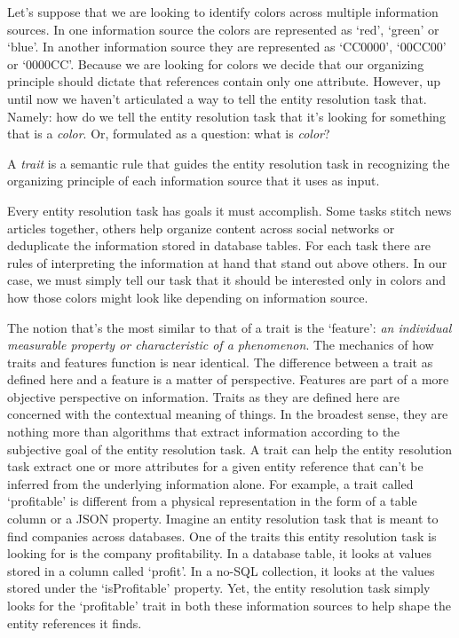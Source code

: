 \documentclass[11pt]{article}
\begin{document}
    Let's suppose that we are looking to identify colors across multiple
    information sources.
    In one information source the colors are represented as `red', `green' or 
    `blue'.
    In another information source they are represented as `CC0000', `00CC00' or
    `0000CC'.
    Because we are looking for colors we decide that our organizing principle
    should dictate that references contain only one attribute.
    However, up until now we haven't articulated a way to tell the entity
    resolution task that.
    Namely: how do we tell the entity resolution task that it's looking for
    something that is a \textit{color}.
    Or, formulated as a question: what is \textit{color}?

    \begin{defn}
        A \textit{trait} is a semantic rule that guides the entity resolution
        task in recognizing the organizing principle of each information source
        that it uses as input.
    \end{defn}

    Every entity resolution task has goals it must accomplish.
    Some tasks stitch news articles together, others help organize content
    across social networks or deduplicate the information stored in database
    tables.
    For each task there are rules of interpreting the information at hand that
    stand out above others.
    In our case, we must simply tell our task that it should be interested only
    in colors and how those colors might look like depending on information
    source.
    
    The notion that's the most similar to that of a trait is the `feature':
    \textit{an individual measurable property or characteristic of a
    phenomenon}\cite{bishop2006pattern}.
    The mechanics of how traits and features function is near identical.
    The difference between a trait as defined here and a feature is a matter of
    perspective.
    Features are part of a more objective perspective on information.
    Traits as they are defined here are concerned with the contextual meaning of
    things.
    In the broadest sense, they are nothing more than algorithms that extract
    information according to the subjective goal of the entity resolution task.
    A trait can help the entity resolution task extract one or more attributes
    for a given entity reference that can't be inferred from the underlying
    information alone.
    For example, a trait called `profitable' is different from a physical
    representation in the form of a table column or a JSON property.
    Imagine an entity resolution task that is meant to find companies across
    databases.
    One of the traits this entity resolution task is looking for is the company
    profitability.
    In a database table, it looks at values stored in a column called `profit'.
    In a no-SQL collection, it looks at the values stored under the
    `isProfitable' property.
    Yet, the entity resolution task simply looks for the `profitable' trait in
    both these information sources to help shape the entity references it finds.
\end{document}
